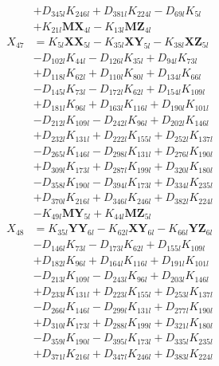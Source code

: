 \begin{multicols}{2}
\begin{align}
&+ D_{345l}K_{246l} + D_{381l}K_{224l} - D_{69l}K_{5l}  \nonumber \\
&+ K_{21l}\mathbf{MX}_{4l} - K_{13l}\mathbf{MZ}_{4l} \nonumber \\
X_{47} &= K_{5l}\mathbf{XX}_{5l} - K_{35l}\mathbf{XY}_{5l} - K_{38l}\mathbf{XZ}_{5l}  \nonumber \\
&- D_{102l}K_{44l} - D_{126l}K_{35l} + D_{94l}K_{73l}  \nonumber \\
&+ D_{118l}K_{62l} + D_{110l}K_{80l} + D_{134l}K_{66l}  \nonumber \\
&- D_{145l}K_{73l} - D_{172l}K_{62l} + D_{154l}K_{109l}  \nonumber \\
&+ D_{181l}K_{96l} + D_{163l}K_{116l} + D_{190l}K_{101l}  \nonumber \\
&- D_{212l}K_{109l} - D_{242l}K_{96l} + D_{202l}K_{146l}  \nonumber \\
&+ D_{232l}K_{131l} + D_{222l}K_{155l} + D_{252l}K_{137l}  \nonumber \\
&- D_{265l}K_{146l} - D_{298l}K_{131l} + D_{276l}K_{190l}  \nonumber \\
&+ D_{309l}K_{173l} + D_{287l}K_{199l} + D_{320l}K_{180l}  \nonumber \\
&- D_{358l}K_{190l} - D_{394l}K_{173l} + D_{334l}K_{235l}  \nonumber \\
&+ D_{370l}K_{216l} + D_{346l}K_{246l} + D_{382l}K_{224l}  \nonumber \\
&- K_{49l}\mathbf{MY}_{5l} + K_{44l}\mathbf{MZ}_{5l} \nonumber \\
X_{48} &= K_{35l}\mathbf{YY}_{6l} - K_{62l}\mathbf{XY}_{6l} - K_{66l}\mathbf{YZ}_{6l}  \nonumber \\
&- D_{146l}K_{73l} - D_{173l}K_{62l} + D_{155l}K_{109l}  \nonumber \\
&+ D_{182l}K_{96l} + D_{164l}K_{116l} + D_{191l}K_{101l}  \nonumber \\
&- D_{213l}K_{109l} - D_{243l}K_{96l} + D_{203l}K_{146l}  \nonumber \\
&+ D_{233l}K_{131l} + D_{223l}K_{155l} + D_{253l}K_{137l}  \nonumber \\
&- D_{266l}K_{146l} - D_{299l}K_{131l} + D_{277l}K_{190l}  \nonumber \\
&+ D_{310l}K_{173l} + D_{288l}K_{199l} + D_{321l}K_{180l}  \nonumber \\
&- D_{359l}K_{190l} - D_{395l}K_{173l} + D_{335l}K_{235l}  \nonumber \\
&+ D_{371l}K_{216l} + D_{347l}K_{246l} + D_{383l}K_{224l}  \nonumber \\

\end{align}
\end{multicols}

